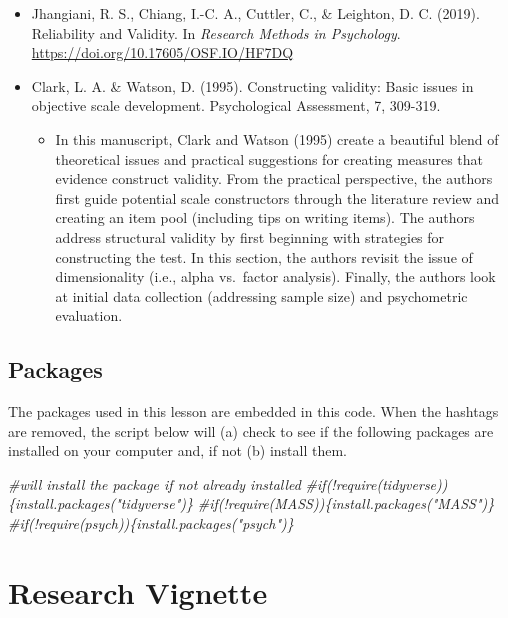 \documentclass[
  english,
]{book}
\newenvironment{Shaded}{\begin{snugshade}}{\end{snugshade}}
\newcommand{\CommentTok}[1]{\textcolor[rgb]{0.56,0.35,0.01}{\textit{#1}}}
\providecommand{\tightlist}{%
  \setlength{\itemsep}{0pt}\setlength{\parskip}{0pt}}
\begin{document}
\begin{itemize}
\tightlist
\item
  Jhangiani, R. S., Chiang, I.-C. A., Cuttler, C., \& Leighton, D. C. (2019). Reliability and Validity. In \emph{Research Methods in Psychology}. \url{https://doi.org/10.17605/OSF.IO/HF7DQ}
\item
  Clark, L. A. \& Watson, D. (1995). Constructing validity: Basic issues in objective scale development. Psychological Assessment, 7, 309-319.

  \begin{itemize}
  \tightlist
  \item
    In this manuscript, Clark and Watson (1995) create a beautiful blend of theoretical issues and practical suggestions for creating measures that evidence construct validity. From the practical perspective, the authors first guide potential scale constructors through the literature review and creating an item pool (including tips on writing items). The authors address structural validity by first beginning with strategies for constructing the test. In this section, the authors revisit the issue of dimensionality (i.e., alpha vs.~factor analysis). Finally, the authors look at initial data collection (addressing sample size) and psychometric evaluation.
  \end{itemize}
\end{itemize}

\hypertarget{packages-2}{%
\subsection{Packages}\label{packages-2}}

The packages used in this lesson are embedded in this code. When the hashtags are removed, the script below will (a) check to see if the following packages are installed on your computer and, if not (b) install them.

\begin{Shaded}
\begin{Highlighting}[]
\CommentTok{#will install the package if not already installed}
\CommentTok{#if(!require(tidyverse))\{install.packages("tidyverse")\}}
\CommentTok{#if(!require(MASS))\{install.packages("MASS")\}}
\CommentTok{#if(!require(psych))\{install.packages("psych")\}}
\end{Highlighting}
\end{Shaded}

\hypertarget{research-vignette-1}{%
\section{Research Vignette}\label{research-vignette-1}}
\end{document}
